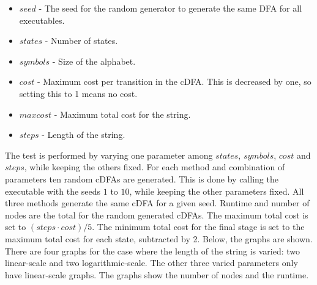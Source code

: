 \documentclass[a4paper,11pt]{article}
\begin{document}
\begin{itemize}
\item{$seed$} - The seed for the random generator to generate the same DFA for all executables.
\item{$states$} - Number of states.
\item{$symbols$} - Size of the alphabet.
\item{$cost$} - Maximum cost per transition in the cDFA. This is decreased by one, so setting this to 1 means no cost.
\item{$maxcost$} - Maximum total cost for the string.
\item{$steps$} - Length of the string.
\end{itemize}
The test is performed by varying one parameter among $\mathit{states}$, $\mathit{symbols}$, $\mathit{cost}$ and $\mathit{steps}$, while keeping the others fixed. For each method and combination of parameters ten random cDFAs are generated. This is done by calling the executable with the seeds $1$ to $10$, while keeping the other parameters fixed. All three methods generate the same cDFA for a given seed. Runtime and number of nodes are the total for the random generated cDFAs. The maximum total cost is set to $(\mathit{steps}\cdot \mathit{cost})/5$. The minimum total cost for the final stage is set to the maximum total cost for each state, subtracted by 2. Below, the graphs are shown. There are four graphs for the case where the length of the string is varied: two linear-scale and two logarithmic-scale. The other three varied parameters only have linear-scale graphs. The graphs show the number of nodes and the runtime.






%
\end{document}
